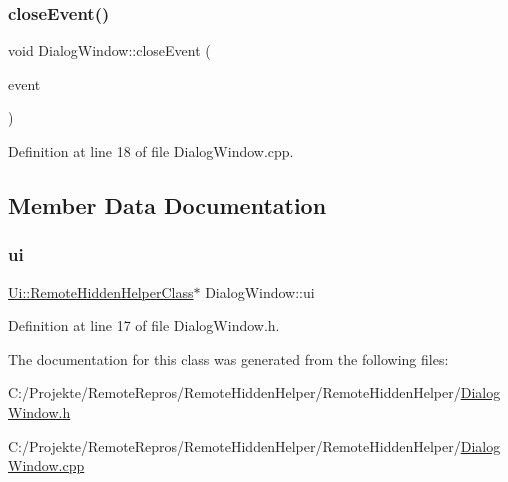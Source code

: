 \subsubsection{\texorpdfstring{close\+Event()}{closeEvent()}}
{\footnotesize\ttfamily void Dialog\+Window\+::close\+Event (\begin{DoxyParamCaption}\item[{Q\+Close\+Event $\ast$}]{event }\end{DoxyParamCaption})\hspace{0.3cm}{\ttfamily [protected]}}



Definition at line 18 of file Dialog\+Window.\+cpp.



\subsection{Member Data Documentation}
\hypertarget{class_dialog_window_ace4feb50f11737df8753b57b936d8fe2}{}\label{class_dialog_window_ace4feb50f11737df8753b57b936d8fe2} 
\subsubsection{\texorpdfstring{ui}{ui}}
{\footnotesize\ttfamily \hyperlink{class_ui_1_1_remote_hidden_helper_class}{Ui\+::\+Remote\+Hidden\+Helper\+Class}$\ast$ Dialog\+Window\+::ui\hspace{0.3cm}{\ttfamily [private]}}



Definition at line 17 of file Dialog\+Window.\+h.



The documentation for this class was generated from the following files\+:\begin{DoxyCompactItemize}
\item 
C\+:/\+Projekte/\+Remote\+Repros/\+Remote\+Hidden\+Helper/\+Remote\+Hidden\+Helper/\hyperlink{_dialog_window_8h}{Dialog\+Window.\+h}\item 
C\+:/\+Projekte/\+Remote\+Repros/\+Remote\+Hidden\+Helper/\+Remote\+Hidden\+Helper/\hyperlink{_dialog_window_8cpp}{Dialog\+Window.\+cpp}\end{DoxyCompactItemize}
